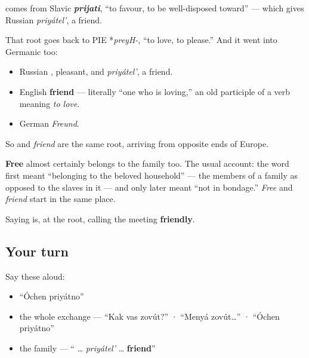 \begin{cousinweb}
\emph{} comes from Slavic \emph{\textbf{prijati}}, \textquotedblleft{}to favour, to be well-disposed toward\textquotedblright{} — which gives Russian \emph{priyátel'}, a friend.

That root goes back to PIE *\emph{preyH-}, \textquotedblleft{}to love, to please.\textquotedblright{} And it went into Germanic too:

\begin{itemize}
\raggedright
  \item Russian \textbf{}, pleasant, and \emph{priyátel'}, a friend.
  \item English \textbf{friend} — literally \textquotedblleft{}one who is loving,\textquotedblright{} an old participle of a verb meaning \emph{to love}.
  \item German \emph{Freund}.
\end{itemize}

So \emph{} and \emph{friend} are the same root, arriving from opposite ends of Europe.

\textbf{Free} almost certainly belongs to the family too. The usual account: the word first meant \textquotedblleft{}belonging to the beloved household\textquotedblright{} — the members of a family as opposed to the slaves in it — and only later meant \textquotedblleft{}not in bondage.\textquotedblright{} \emph{Free} and \emph{friend} start in the same place.

Saying \emph{ } is, at the root, calling the meeting \textbf{friendly}.
\end{cousinweb}

\subsection*{Your turn}
Say these aloud:

\begin{itemize}
\raggedright
  \item \textquotedblleft{}Óchen priyátno\textquotedblright{}
  \item the whole exchange — \textquotedblleft{}Kak vas zovút?\textquotedblright{} · \textquotedblleft{}Menyá zovút…\textquotedblright{} · \textquotedblleft{}Óchen priyátno\textquotedblright{}
  \item the family — \textquotedblleft{}\textbf{} … \emph{priyátel'} … \textbf{friend}\textquotedblright{}
\end{itemize}

